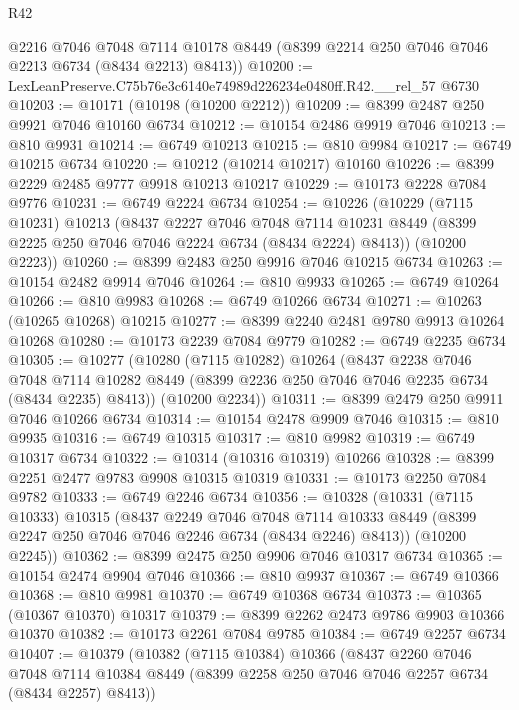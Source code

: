 \begin{lexlean}{R42}
\begin{coremodule}
{      @2216
      @7046
      @7048
      @7114
      @10178
      @8449
      (@8399 @2214 @250 @7046 @7046 @2213 @6734 (@8434 @2213) @8413))
@10200 := LexLeanPreserve.C75b76e3c6140e74989d226234e0480ff.R42.__rel_57 @6730
@10203 := @10171 (@10198 (@10200 @2212))
@10209 := @8399 @2487 @250 @9921 @7046 @10160 @6734
@10212 := @10154 @2486 @9919 @7046
@10213 := @810 @9931
@10214 := @6749 @10213
@10215 := @810 @9984
@10217 := @6749 @10215 @6734
@10220 := @10212 (@10214 @10217) @10160
@10226 := @8399 @2229 @2485 @9777 @9918 @10213 @10217
@10229 := @10173 @2228 @7084 @9776
@10231 := @6749 @2224 @6734
@10254 := @10226
    (@10229
      (@7115 @10231)
      @10213
      (@8437
        @2227
        @7046
        @7048
        @7114
        @10231
        @8449
        (@8399 @2225 @250 @7046 @7046 @2224 @6734 (@8434 @2224) @8413))
      (@10200 @2223))
@10260 := @8399 @2483 @250 @9916 @7046 @10215 @6734
@10263 := @10154 @2482 @9914 @7046
@10264 := @810 @9933
@10265 := @6749 @10264
@10266 := @810 @9983
@10268 := @6749 @10266 @6734
@10271 := @10263 (@10265 @10268) @10215
@10277 := @8399 @2240 @2481 @9780 @9913 @10264 @10268
@10280 := @10173 @2239 @7084 @9779
@10282 := @6749 @2235 @6734
@10305 := @10277
    (@10280
      (@7115 @10282)
      @10264
      (@8437
        @2238
        @7046
        @7048
        @7114
        @10282
        @8449
        (@8399 @2236 @250 @7046 @7046 @2235 @6734 (@8434 @2235) @8413))
      (@10200 @2234))
@10311 := @8399 @2479 @250 @9911 @7046 @10266 @6734
@10314 := @10154 @2478 @9909 @7046
@10315 := @810 @9935
@10316 := @6749 @10315
@10317 := @810 @9982
@10319 := @6749 @10317 @6734
@10322 := @10314 (@10316 @10319) @10266
@10328 := @8399 @2251 @2477 @9783 @9908 @10315 @10319
@10331 := @10173 @2250 @7084 @9782
@10333 := @6749 @2246 @6734
@10356 := @10328
    (@10331
      (@7115 @10333)
      @10315
      (@8437
        @2249
        @7046
        @7048
        @7114
        @10333
        @8449
        (@8399 @2247 @250 @7046 @7046 @2246 @6734 (@8434 @2246) @8413))
      (@10200 @2245))
@10362 := @8399 @2475 @250 @9906 @7046 @10317 @6734
@10365 := @10154 @2474 @9904 @7046
@10366 := @810 @9937
@10367 := @6749 @10366
@10368 := @810 @9981
@10370 := @6749 @10368 @6734
@10373 := @10365 (@10367 @10370) @10317
@10379 := @8399 @2262 @2473 @9786 @9903 @10366 @10370
@10382 := @10173 @2261 @7084 @9785
@10384 := @6749 @2257 @6734
@10407 := @10379
    (@10382
      (@7115 @10384)
      @10366
      (@8437
        @2260
        @7046
        @7048
        @7114
        @10384
        @8449
        (@8399 @2258 @250 @7046 @7046 @2257 @6734 (@8434 @2257) @8413))
}
\end{coremodule}
\end{lexlean}
